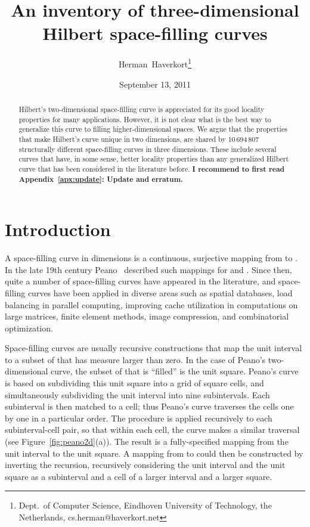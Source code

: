 \documentclass[11pt,a4paper]{article}
\begin{document}
\title{An inventory of three-dimensional Hilbert space-filling curves}
\author{Herman~Haverkort\thanks{Dept.\ of Computer Science, Eindhoven University of Technology, the Netherlands, cs.herman@haverkort.net}
}
\date{September 13, 2011}
\maketitle

\begin{abstract}
Hilbert's two-dimensional space-filling curve is appreciated for its good locality properties for many applications. However, it is not clear what is the best way to generalize this curve to filling higher-dimensional spaces. We argue that the properties that make Hilbert's curve unique in two dimensions, are shared by 10\,694\,807 structurally different space-filling curves in three dimensions. These include several curves that have, in some sense, better locality properties than any generalized Hilbert curve that has been considered in the literature before.
\textbf{I recommend to first read Appendix~\ref{apx:update}: Update and erratum.}
\end{abstract}

\section{Introduction}
A space-filling curve in  dimensions is a continuous, surjective mapping from  to .
In the late 19th century Peano~\cite{Peano} described such mappings for  and . Since then, quite a number of space-filling curves have appeared in the literature, and space-filling curves have been applied in diverse areas such as spatial databases, load balancing in parallel computing, improving cache utilization in computations on large matrices, finite element methods, image compression, and combinatorial optimization.

Space-filling curves are usually recursive constructions that map the unit interval  to a subset of  that has measure larger than zero. In the case of Peano's two-dimensional curve, the subset of  that is ``filled'' is the unit square. Peano's curve is based on subdividing this unit square into a grid of  square cells, and simultaneously subdividing the unit interval into nine subintervals. Each subinterval is then matched to a cell; thus Peano's curve traverses the cells one by one in a particular order. The procedure is applied recursively to each subinterval-cell pair, so that within each cell, the curve makes a similar traversal (see Figure~\ref{fig:peano2d}(a)). The result is a fully-specified mapping from the unit interval to the unit square. A mapping from  to  could then be constructed by inverting the recursion, recursively considering the unit interval and the unit square as a subinterval and a cell of a larger interval and a larger square.
\end{document}
